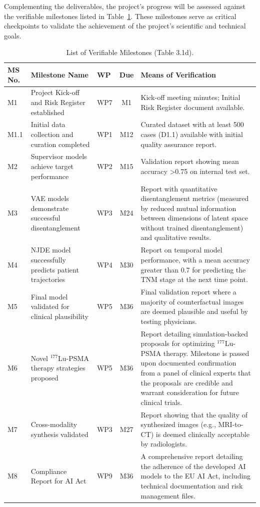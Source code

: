 \documentclass[11pt, a4paper]{article}
\begin{document}
Complementing the deliverables, the project's progress will be assessed against the verifiable milestones listed in Table~\ref{tab:milestones}. These milestones serve as critical checkpoints to validate the achievement of the project's scientific and technical goals.

\begin{table}[H]
    \centering
    \caption{List of Verifiable Milestones (Table 3.1d).}
    \label{tab:milestones}
    \small
    \begin{tabular}{lp{5.5cm}lcp{5cm}}
        \toprule
        \textbf{MS No.} & \textbf{Milestone Name} & \textbf{WP} & \textbf{Due} & \textbf{Means of Verification} \\
        \midrule
        M1 & Project Kick-off and Risk Register established & WP7 & M1 & Kick-off meeting minutes; Initial Risk Register document available. \\
        M1.1 & Initial data collection and curation completed & WP1 & M12 & Curated dataset with at least 500 cases (D1.1) available with initial quality assurance report. \\
        M2 & Supervisor models achieve target performance & WP2 & M15 & Validation report showing mean accuracy >0.75 on internal test set. \\
        M3 & VAE models demonstrate successful disentanglement & WP3 & M24 & Report with quantitative disentanglement metrics (measured by reduced mutual information between dimensions of latent space without trained disentanglement) and qualitative results. \\
        M4 & NJDE model successfully predicts patient trajectories & WP4 & M30 & Report on temporal model performance, with a mean accuracy greater than 0.7 for predicting the TNM stage at the next time point. \\
        M5 & Final model validated for clinical plausibility & WP5 & M36 & Final validation report where a majority of counterfactual images are deemed plausible and useful by testing physicians. \\
        M6 & Novel $^{177}$Lu-PSMA therapy strategies proposed & WP5 & M36 & Report detailing simulation-backed proposals for optimizing $^{177}$Lu-PSMA therapy. Milestone is passed upon documented confirmation from a panel of clinical experts that the proposals are credible and warrant consideration for future clinical trials. \\
        M7 & Cross-modality synthesis validated & WP3 & M27 & Report showing that the quality of synthesized images (e.g., MRI-to-CT) is deemed clinically acceptable by radiologists. \\
        M8 & Compliance Report for AI Act & WP9 & M36 & A comprehensive report detailing the adherence of the developed AI models to the EU AI Act, including technical documentation and risk management files. \\
        \bottomrule
    \end{tabular}
\end{table}
\end{document}
